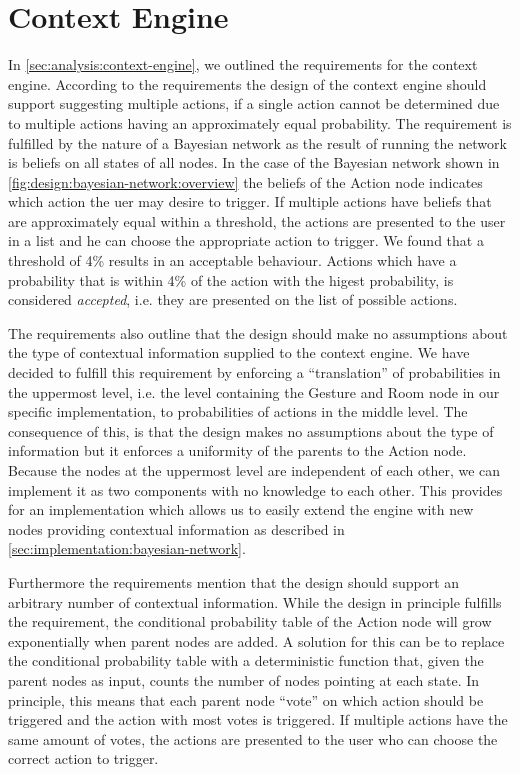 \section{Context Engine}
\label{sec:design:context-engine}

In \cref{sec:analysis:context-engine}, we outlined the requirements for the context engine. According to the requirements the design of the context engine should support suggesting multiple actions, if a single action cannot be determined due to multiple actions having an approximately equal probability. The requirement is fulfilled by the nature of a Bayesian network as the result of running the network is beliefs on all states of all nodes. In the case of the Bayesian network shown in \cref{fig:design:bayesian-network:overview} the beliefs of the Action node indicates which action the uer may desire to trigger.
If multiple actions have beliefs that are approximately equal within a threshold, the actions are presented to the user in a list and he can choose the appropriate action to trigger. We found that a threshold of 4\% results in an acceptable behaviour. Actions which have a probability that is within 4\% of the action with the higest probability, is considered \emph{accepted}, i.e. they are presented on the list of possible actions.

The requirements also outline that the design should make no assumptions about the type of contextual information supplied to the context engine. We have decided to fulfill this requirement by enforcing a ``translation'' of probabilities in the uppermost level, i.e. the level containing the Gesture and Room node in our specific implementation, to probabilities of actions in the middle level.
The consequence of this, is that the design makes no assumptions about the type of information but it enforces a uniformity of the parents to the Action node.
Because the nodes at the uppermost level are independent of each other, we can implement it as two components with no knowledge to each other. This provides for an implementation which allows us to easily extend the engine with new nodes providing contextual information as described in \cref{sec:implementation:bayesian-network}.

Furthermore the requirements mention that the design should support an arbitrary number of contextual information. While the design in principle fulfills the requirement, the conditional probability table of the Action node will grow exponentially when parent nodes are added.
A solution for this can be to replace the conditional probability table with a deterministic function that, given the parent nodes as input, counts the number of nodes pointing at each state. In principle, this means that each parent node ``vote'' on which action should be triggered and the action with most votes is triggered. If multiple actions have the same amount of votes, the actions are presented to the user who can choose the correct action to trigger.

